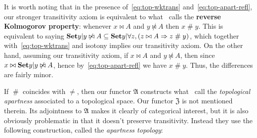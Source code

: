 \documentclass{article}
\def\apart{\mathrel{\#}}
\let\implies\Rightarrow
\def\anti{\mathfrak{A}}
\def\neigh{\mathfrak{Z}}
\begin{document}
It is worth noting that in the presence of~\eqref{eq:top-wktrans} and~\eqref{eq:top-apart-refl}, our stronger transitivity axiom is equivalent to what~\cite{bridges-vita} calls the \textbf{reverse Kolmogorov property}: whenever $x\bowtie A$ and $y\not\bowtie A$ then $x\apart y$.
This is equivalent to saying $\setof{y|y\not\bowtie A} \subseteq \setof{ y | \forall z, (z\bowtie A \implies z\apart y)}$, which together with~\eqref{eq:top-wktrans} and isotony implies our transitivity axiom.
On the other hand, assuming our transitivity axiom, if $x\bowtie A$ and $y\not\bowtie A$, then since $x\bowtie \setof{y|y\not\bowtie A}$, hence by~\eqref{eq:top-apart-refl} we have $x\apart y$.
Thus, the differences are fairly minor.

If $\apart$ coincides with $\neq$, then our functor $\anti$ constructs what~\cite{bridges-vita} call the \emph{topological apartness} associated to a topological space.
Our functor $\neigh$ is not mentioned therein.
Its adjointness to $\anti$ makes it clearly of categorical interest, but it is also obviously problematic in that it doesn't preserve transitivity.
Instead they use the following construction, called the \emph{apartness topology}:
\end{document}

